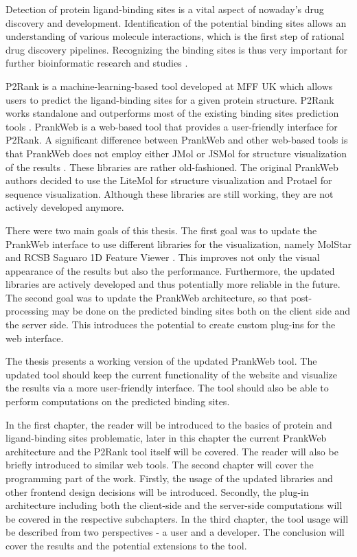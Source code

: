 

Detection of protein ligand-binding sites is a vital aspect of nowaday's drug discovery and development. Identification of the potential binding sites allows an understanding of various molecule interactions, which is the first step of rational drug discovery pipelines. Recognizing the binding sites is thus very important for further bioinformatic research and studies \cite{10.1093/bioinformatics/btt447}.

P2Rank is a machine-learning-based tool developed at MFF UK which allows users to predict the ligand-binding sites for a given protein structure. P2Rank works standalone and outperforms most of the existing binding sites prediction tools \cite{krivak2018p2rank}. PrankWeb is a web-based tool that provides a user-friendly interface for P2Rank. A significant difference between PrankWeb and other web-based tools is that PrankWeb does not employ either JMol or JSMol for structure visualization of the results \cite{jendele2019prankweb}. These libraries are rather old-fashioned. The original PrankWeb authors decided to use the LiteMol for structure visualization and Protael for sequence visualization. Although these libraries are still working, they are not actively developed anymore.

There were two main goals of this thesis. The first goal was to update the PrankWeb interface to use different libraries for the visualization, namely MolStar \cite{10.1093/nar/gkab314} and RCSB Saguaro 1D Feature Viewer \cite{10.1093/bioinformatics/btaa1012}. This improves not only the visual appearance of the results but also the performance. Furthermore, the updated libraries are actively developed and thus potentially more reliable in the future. The second goal was to update the PrankWeb architecture, so that post-processing may be done on the predicted binding sites both on the client side and the server side. This introduces the potential to create custom plug-ins for the web interface.

The thesis presents a working version of the updated PrankWeb tool. The updated tool should keep the current functionality of the website and visualize the results via a more user-friendly interface. The tool should also be able to perform computations on the predicted binding sites.

In the first chapter, the reader will be introduced to the basics of protein and ligand-binding sites problematic, later in this chapter the current PrankWeb architecture and the P2Rank tool itself will be covered. The reader will also be briefly introduced to similar web tools. The second chapter will cover the programming part of the work. Firstly, the usage of the updated libraries and other frontend design decisions will be introduced. Secondly, the plug-in architecture including both the client-side and the server-side computations will be covered in the respective subchapters. In the third chapter, the tool usage will be described from two perspectives - a user and a developer. The conclusion will cover the results and the potential extensions to the tool.
